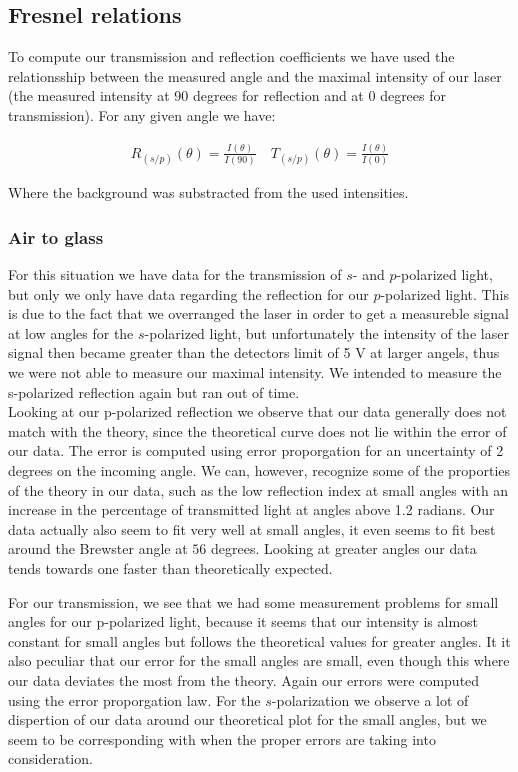 \subsection{Fresnel relations}

To compute our transmission and reflection coefficients we have used the relationsship between the measured angle and the maximal intensity of our laser (the measured intensity at 90 degrees for reflection and at 0 degrees for transmission). For any given angle we have:

\begin{align}
R_(s/p)(\theta)=\frac{I(\theta)}{I(90)} \quad T_(s/p)(\theta)=\frac{I(\theta)}{I(0)}
\end{align}

Where the background was substracted from the used intensities. 

\subsubsection{Air to glass}

For this situation we have data for the transmission of $s$- and $p$-polarized light, but only we only have data regarding the reflection for our $p$-polarized light. This is due to the fact that we overranged the laser in order to get a measureble signal at low angles for the $s$-polarized light, but unfortunately the intensity of the laser signal then became greater than the detectors limit of 5 V at larger angels, thus we were not able to measure our maximal intensity. We intended to measure the s-polarized reflection again but ran out of time.\\

Looking at our p-polarized reflection we observe that our data generally does not match with the theory, since the theoretical curve does not lie within the error of our data. The error is computed using error proporgation for an uncertainty of 2 degrees on the incoming angle. We can, however, recognize some of the proporties of the theory in our data, such as the low reflection index at small angles with an increase in the percentage of transmitted light at angles above 1.2 radians. Our data actually also seem to fit very well at small angles, it even seems to fit best around the Brewster angle at $56$ degrees. Looking at greater angles our data tends towards one faster than theoretically expected. 

For our transmission, we see that we had some measurement problems for small angles for our p-polarized light, because it seems that our intensity is almost constant for small angles but follows the theoretical values for greater angles. It it also peculiar that our error for the small angles are small, even though this where our data deviates the most from the theory. Again our errors were computed using the error proporgation law. For the $s$-polarization we observe a lot of dispertion of our data around our theoretical plot for the small angles, but we seem to be corresponding with when the proper errors are taking into consideration.

